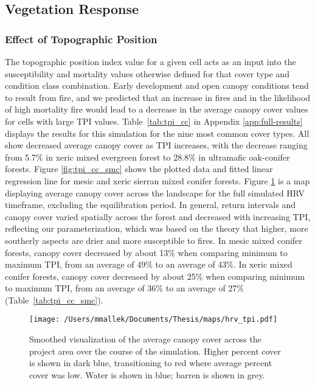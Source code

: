 \clearpage



\subsection{Vegetation Response}
\label{subsec:HRVvegresponse}

\subsubsection{Effect of Topographic Position}
The topographic position index value for a given cell acts as an input into the susceptibility and mortality values otherwise defined for that cover type and condition class combination. Early development and open canopy conditions tend to result from fire, and we predicted that an increase in fires and in the likelihood of high mortality fire would lead to a decrease in the average canopy cover values for cells with large TPI values. Table~\ref{tab:tpi_cc} in Appendix \ref{app:full-results} displays the results for this simulation for the nine most common cover types. All show decreased average canopy cover as TPI increases, with the decrease ranging from 5.7\% in xeric mixed evergreen forest to 28.8\% in ultramafic oak-conifer forests. Figure \ref{fig:tpi_cc_smc} shows the plotted data and fitted linear regression line for mesic and xeric sierran mixed conifer forests. Figure \ref{fig:averagecc} is a map displaying average canopy cover across the landscape for the full simulated HRV timeframe, excluding the equilibration period. In general, return intervals and canopy cover varied spatially across the forest and decreased with increasing TPI, reflecting our parameterization, which was based on the theory that higher, more southerly aspects are drier and more susceptible to fires. In mesic mixed conifer forests, canopy cover decreased by about 13\% when comparing minimum to maximum TPI, from an average of 49\% to an average of 43\%. In xeric mixed conifer forests, canopy cover decreased by about 25\% when comparing minimum to maximum TPI, from an average of 36\% to an average of 27\% (Table~\ref{tab:tpi_cc_smc}).

\begin{figure}[!htbp]
\centering
\texttt{[image: /Users/mmallek/Documents/Thesis/maps/hrv\_tpi.pdf]}
\caption{Smoothed visualization of the average canopy cover across the project area over the course of the simulation. Higher percent cover is shown in dark blue, transitioning to red where average percent cover was low. Water is shown in blue; barren is shown in grey.}
\label{fig:averagecc}
\end{figure}

